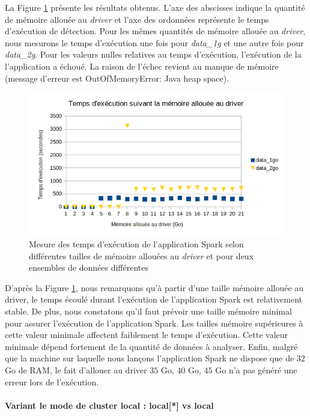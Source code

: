La Figure 	\ref{fig:variantdrivermemory} présente les résultats obtenus. L'axe des abscisses indique la quantité de mémoire allouée au \textit{driver} et l'axe des ordonnées représente le temps d'exécution de détection. Pour les mêmes quantités de mémoire allouée au \textit{driver}, nous mesurons le temps d'exécution une fois pour  \textit{data\_1g}  et une autre fois pour  \textit{data\_2g}.
Pour les valeurs nulles relatives au temps d'exécution, l'exécution de la l'application a échoué. La raison de l'échec revient au manque de mémoire (message d'erreur est OutOfMemoryError: Java heap space).
\begin{figure}[H]
	\centering
	\captionsetup{justification=centering}
	\includegraphics[width=1\linewidth]{illustrations/variant_driver_memory}
	\caption{Mesure des temps d'exécution de l'application Spark selon différentes tailles de mémoire allouées au \textit{driver} et pour deux ensembles de données différentes}
	\label{fig:variantdrivermemory}
\end{figure}

D'après la Figure 	\ref{fig:variantdrivermemory}, nous remarquons qu'à partir d'une taille mémoire allouée au driver, le temps écoulé durant l'exécution de l'application Spark est relativement stable. De plus, nous constatons qu'il faut prévoir une taille mémoire minimal pour assurer l'exécution de l'application Spark. Les tailles mémoire supérieures à cette valeur minimale affectent faiblement le temps d'exécution.  Cette valeur minimale dépend fortement de la quantité de données à analyser. Enfin, malgré que la machine sur laquelle nous lançons l'application Spark ne dispose que de $ 32 $ Go de RAM, le fait d'allouer au driver $ 35 $ Go, $ 40$ Go, $ 45 $ Go n'a pas généré une erreur lors de l'exécution.


\paragraph{Variant le mode de cluster local : local[*] vs local}


